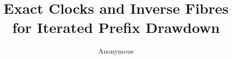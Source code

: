 \documentclass[11pt]{article}
\title{Exact Clocks and Inverse Fibres for Iterated Prefix Drawdown}
\author{Anonymous}
\date{}
\begin{document}
\maketitle
\begin{abstract}

\end{abstract}






\end{document}
